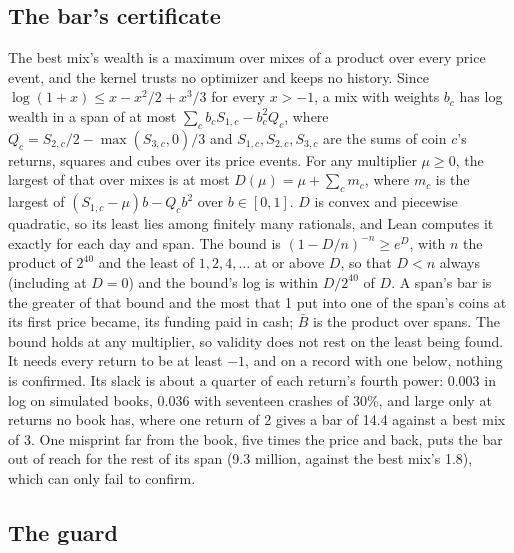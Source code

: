 \documentclass[11pt]{article}
\begin{document}
\subsection{The bar's certificate}

The best mix's wealth is a maximum over mixes of a product over every price event, and the kernel trusts no optimizer and keeps no history. Since $\log(1+x)\le x-x^2/2+x^3/3$ for every $x>-1$, a mix with weights $b_c$ has log wealth in a span of at most $\sum_c b_cS_{1,c}-b_c^2Q_c$, where $Q_c=S_{2,c}/2-\max(S_{3,c},0)/3$ and $S_{1,c},S_{2,c},S_{3,c}$ are the sums of coin $c$'s returns, squares and cubes over its price events. For any multiplier $\mu\ge0$, the largest of that over mixes is at most $D(\mu)=\mu+\sum_cm_c$, where $m_c$ is the largest of $(S_{1,c}-\mu)b-Q_cb^2$ over $b\in[0,1]$. $D$ is convex and piecewise quadratic, so its least lies among finitely many rationals, and Lean computes it exactly for each day and span. The bound is $(1-D/n)^{-n}\ge e^D$, with $n$ the product of $2^{40}$ and the least of $1,2,4,\ldots$ at or above $D$, so that $D<n$ always (including at $D=0$) and the bound's log is within $D/2^{40}$ of $D$. A span's bar is the greater of that bound and the most that 1 put into one of the span's coins at its first price became, its funding paid in cash; $\bar B$ is the product over spans. The bound holds at any multiplier, so validity does not rest on the least being found. It needs every return to be at least $-1$, and on a record with one below, nothing is confirmed. Its slack is about a quarter of each return's fourth power: 0.003 in log on simulated books, 0.036 with seventeen crashes of 30\%, and large only at returns no book has, where one return of 2 gives a bar of 14.4 against a best mix of 3. One misprint far from the book, five times the price and back, puts the bar out of reach for the rest of its span (9.3 million, against the best mix's 1.8), which can only fail to confirm.

\subsection{The guard}
\end{document}
